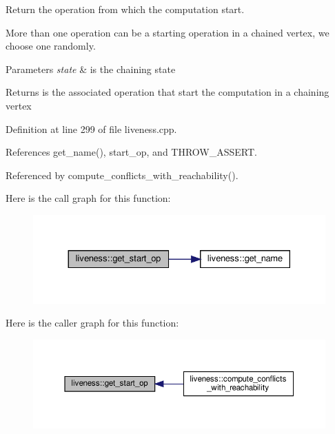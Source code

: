 Return the operation from which the computation start. 

More than one operation can be a starting operation in a chained vertex, we choose one randomly. 
\begin{DoxyParams}{Parameters}
{\em state} & is the chaining state \\
\hline
\end{DoxyParams}
\begin{DoxyReturn}{Returns}
is the associated operation that start the computation in a chaining vertex 
\end{DoxyReturn}


Definition at line 299 of file liveness.\+cpp.



References get\+\_\+name(), start\+\_\+op, and T\+H\+R\+O\+W\+\_\+\+A\+S\+S\+E\+RT.



Referenced by compute\+\_\+conflicts\+\_\+with\+\_\+reachability().

Here is the call graph for this function\+:
\nopagebreak
\begin{figure}[H]
\begin{center}
\leavevmode
\includegraphics[width=330pt]{d3/d1f/classliveness_ad5809b83204b0da9292fae80d9730139_cgraph}
\end{center}
\end{figure}
Here is the caller graph for this function\+:
\nopagebreak
\begin{figure}[H]
\begin{center}
\leavevmode
\includegraphics[width=350pt]{d3/d1f/classliveness_ad5809b83204b0da9292fae80d9730139_icgraph}
\end{center}
\end{figure}
\mbox{\label{classliveness_a9f9d674ef6387aa8c82d444fe2540ed5}} 
